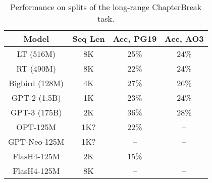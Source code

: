 \begin{table}[h]
    \small
    \centering
    \vspace{-1em}
    \caption{\label{table:chapterbreak} Performance on splits of the long-range ChapterBreak task.}
    {
        \begin{tabular}{@{}cccc@{}}
        Model & Seq Len & Acc, PG19 & Acc, AO3  \\ %
        \hline
        LT (516M) & 8K & 25\% & 24\% \\
        RT (490M) & 8K & 22\% & 24\% \\
        Bigbird (128M) & 4K & 27\% & 26\% \\ \hline
        GPT-2 (1.5B) & 1K & 23\% & 24\% \\ 
        GPT-3 (175B) & 2K & 36\% & 28\% \\ 
        OPT-125M & 1K? & 22\% & -- \\
        GPT-Neo-125M & 1K? & -- & -- \\ \hline
        FlasH4-125M & 2K & 15\% & -- \\ %
        FlasH4-125M & 8K & -- & -- \\ \hline %
        \end{tabular}
    }
    \vspace{-1.5em}
\end{table}